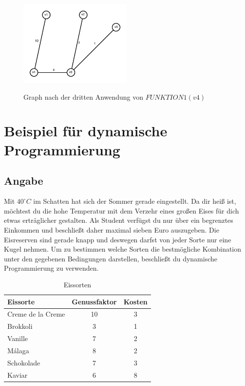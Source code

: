 \documentclass[a4paper, 12pt]{article}
\begin{document}
\begin{figure}[htbp]
	\caption{Graph nach der dritten Anwendung von $FUNKTION1(v4)$}
	\vskip 0.2cm
	\centering
	\includegraphics[width=0.5\textwidth]{Figures/Test_2011-01-14-3A_Step3}
	\label{figure:Test_2011-01-14-3A_Step3}
\end{figure}


\section{Beispiel für dynamische Programmierung}

\subsection{Angabe}

Mit $40^{\circ}C$ im Schatten hat sich der Sommer gerade eingestellt. Da dir heiß ist, möchtest du die hohe Temperatur mit dem Verzehr eines großen Eises für dich etwas erträglicher gestalten. Als Student verfügst du nur über ein begrenztes Einkommen und beschließt daher maximal sieben Euro auszugeben. Die Eisreserven sind gerade knapp und deswegen darfst von jeder Sorte nur eine Kugel nehmen. Um zu bestimmen welche Sorten die bestmögliche Kombination unter den gegebenen Bedingungen darstellen, beschließt du dynamische Programmierung zu verwenden.

\begin{table}[H]
	\begin{center}
		\begin{tabular}{lcc}
			Eissorte & Genussfaktor & Kosten\\
			\hline
			Creme de la Creme	& 10	& 3\\
			Brokkoli			& 3		& 1\\
			Vanille				& 7		& 2\\
			Málaga				& 8		& 2\\
			Schokolade			& 7		& 3\\
			Kaviar				& 6		& 8\\
		\end{tabular}
	\end{center}
\caption{Eissorten}
\label{table:Label}
\end{table}
\end{document}
